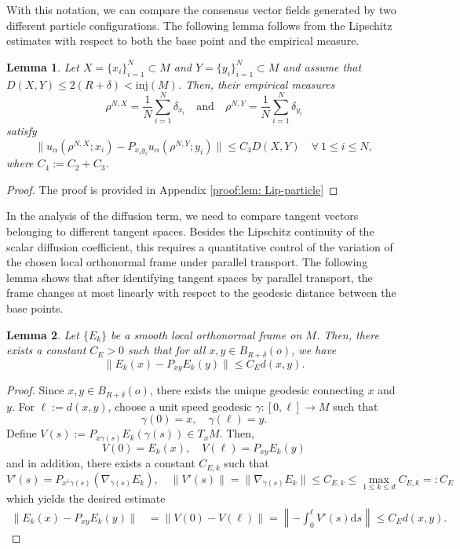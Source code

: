 \documentclass[11pt]{amsart}
\newtheorem{lemma}{Lemma}[section]
\def\d{\mathrm{d}}
\newcommand{\p}{o}%
\begin{document}
 With this notation, we can compare the consensus vector fields generated by two different particle configurations. The following lemma follows from the Lipschitz estimates with respect to both the base point and the empirical measure.

\begin{lemma}\label{lem: Lip-particle}
Let $X=\{x_i\}_{i=1}^N\subset M$ and  $Y=\{y_i\}_{i=1}^N\subset M$ and assume that $D(X, Y) \leq 2(R+\delta)< \mathrm{inj}(M)$. Then, their empirical measures
\[
\rho^{N, X}=\frac{1}{N}\sum_{i=1}^N\delta_{x_i}\quad\text{and}\quad \rho^{N, Y}=\frac{1}{N}\sum_{i=1}^N\delta_{y_i}
\]
satisfy
\[
\|u_\alpha(\rho^{N, X};x_i)-P_{x_iy_i}u_\alpha(\rho^{N, Y};y_i)\|\leq C_4 D(X, Y)\quad\forall~1\leq i\leq N,
\]
where $C_4:=C_2+C_3$.
\end{lemma}

\begin{proof}
The proof is provided in Appendix \ref{proof:lem: Lip-particle}



\end{proof}




In the analysis of the diffusion term, we need to compare tangent vectors belonging to different tangent spaces. Besides the Lipschitz continuity of the scalar diffusion coefficient, this requires a quantitative control of the variation of the chosen local orthonormal frame under parallel transport. The following lemma shows that after identifying tangent spaces by parallel transport, the frame changes at most linearly with respect to the geodesic distance between the base points.

 


\begin{lemma} \label{lem:frame}
Let $\{E_k\}$ be a smooth local orthonormal frame on $M$. Then, there exists a constant $C_E>0$ such that for all $x,y\in B_{R+\delta}(o)$, we have
\[
\|E_k(x) - P_{xy} E_k(y) \| \leq C_E d(x,y).
\]
\end{lemma}


\begin{proof}
Since $x,y\in B_{R+\delta}(\p)$, there exists the unique geodesic connecting $x$ and $y$. For $\ell :=d(x,y)$, choose a  unit speed geodesic $\gamma:[0,\ell]\to M $ such that
\[
\gamma(0)=x,\quad \gamma(\ell)=y.
\]
Define $V(s) := P_{x\gamma(s)}E_k(\gamma(s))\in T_{x}M$. Then, 
\[
V(0)= E_k(x),\quad V(\ell) = P_{xy}E_k(y)
\]
and in addition, there exists a constant $C_{E,k}$ such that
\[
V'(s) =  P_{x^1\gamma(s)} (\nabla_{\dot \gamma(s)} E_k),\quad \|V'(s)\| = \|\nabla_{\dot \gamma(s) }E_k\| \leq C_{E,k} \leq \max_{1\leq k \leq d}C_{E,k}=:C_E
\]
which yields the desired estimate
\begin{align*} 
\| E_k(x) - P_{xy} E_k(y) \| &= \|V(0) - V(\ell)\|  = \left\| -\int_0^\ell V'(s) \d s\right\| \leq C_{E} d(x,y).
\end{align*}

\end{proof}
\end{document}
